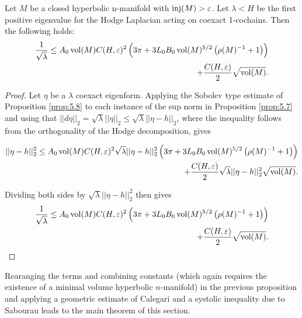 \begin{prop}\label{prop:5.9}
Let $M$ be a closed hyperbolic n-manifold with $\operatorname{inj}(M)> \varepsilon$. Let $\lambda < H$ be the first positive eigenvalue for the Hodge Laplacian acting on coexact 1-cochains. Then the following holds:
\begin{align*}\frac{1}{\sqrt{\lambda}} \leq A_0\operatorname{vol}(M)C(H,\varepsilon)^2
    \left(3\pi+ 3L_0B_0\operatorname{vol}(M)^{5/2}\left(\rho(M)^{-1} + 1\right)\right) \\
    + \frac{C(H,\varepsilon)}{2}\sqrt{\operatorname{vol}(M)}.
\end{align*}
\end{prop}

\begin{proof}Let $\eta$ be a $\lambda$ coexact eigenform.
Applying the Sobolev type estimate of Proposition \ref{prop:5.8} to each instance of the sup norm in Proposition \ref{prop:5.7} and using that $||d\eta||_2=\sqrt{\lambda}||\eta||_2 \leq \sqrt{\lambda}||\eta - h||_2$, where the inequality follows from the orthogonality of the Hodge decomposition, gives

\begin{align*}||\eta-h||_2^2 \leq A_0\operatorname{vol}(M) C(H,\varepsilon) ^2 \sqrt{\lambda} ||\eta-h||_{2}^2 \left(3\pi + 3L_0B_0\operatorname{vol}(M)^{5/2}\left(\rho(M)^{-1}
    + 1\right)\right) \\ + \frac{C(H,\varepsilon)}{2}\sqrt{\lambda} ||\eta-h||_2^2\sqrt{\operatorname{vol}(M)}.
\end{align*}

Dividing both sides by $\sqrt{\lambda} ||\eta-h||_2^2$ then gives \begin{align*} \frac{1}{\sqrt{\lambda}}\leq A_0\operatorname{vol}(M) C(H,\varepsilon) ^2\left(3\pi+ 3L_0B_0\operatorname{vol}(M)^{5/2}\left(\rho(M)^{-1} + 1\right)\right) \\ + \frac{C(H,\varepsilon)}{2}\sqrt{\operatorname{vol}(M)}.\end{align*}\end{proof}

Rearanging the terms and combining constants (which again requires the existence of a minimal volume hyperbolic $n$-manifold) in the previous proposition and applying a geometric estimate of Calegari and a systolic inequality due to Sabourau leads to the main theorem of this section.

